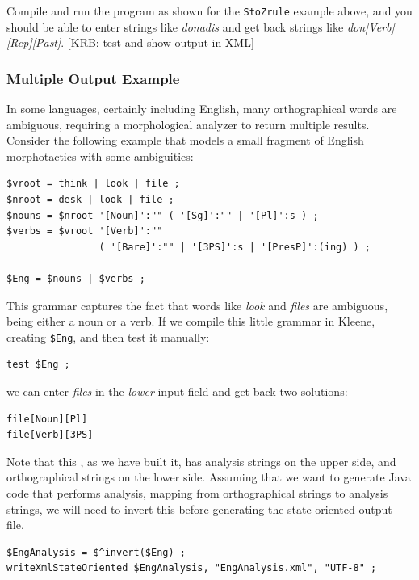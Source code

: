 Compile and run the program as shown for the \texttt{StoZrule} example above, and you should be
able to enter strings like \emph{donadis} and get back strings like \emph{don[Verb][Rep][Past]}.
[KRB: test and show output in XML]



\subsubsection{Multiple Output Example}

In some languages, certainly including English, many orthographical words are ambiguous,
requiring a morphological analyzer to return multiple results.  Consider the following example
that models a small fragment of English morphotactics with some ambiguities:

\begin{Verbatim}
$vroot = think | look | file ;
$nroot = desk | look | file ;
$nouns = $nroot '[Noun]':"" ( '[Sg]':"" | '[Pl]':s ) ;
$verbs = $vroot '[Verb]':"" 
                ( '[Bare]':"" | '[3PS]':s | '[PresP]':(ing) ) ;

$Eng = $nouns | $verbs ;
\end{Verbatim}

\noindent
This grammar captures the fact that words like \emph{look} and \emph{files} are ambiguous,
being either a noun or a verb.  If we compile this little grammar in Kleene, creating
\verb!$Eng!, and then test it manually:

\begin{Verbatim}
test $Eng ;
\end{Verbatim}

\noindent
we can enter \emph{files} in the \emph{lower} input field and get back two solutions:


\begin{Verbatim}
file[Noun][Pl]
file[Verb][3PS]
\end{Verbatim}

Note that this \fsm{}, as we have built it, has analysis strings on the upper side, and
orthographical strings on the lower side.  Assuming that we want to generate Java code that
performs analysis, mapping from orthographical strings to analysis strings, we will need to
invert this \fsm{} before generating the state-oriented \xml{} output file.


\begin{Verbatim}
$EngAnalysis = $^invert($Eng) ;
writeXmlStateOriented $EngAnalysis, "EngAnalysis.xml", "UTF-8" ;
\end{Verbatim}

